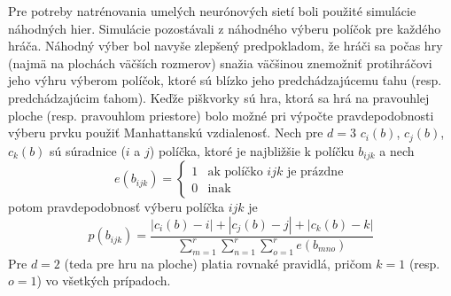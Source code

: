 Pre potreby natrénovania umelých neurónových sietí boli použité simulácie náhodných hier.
Simulácie pozostávali z náhodného výberu políčok pre každého hráča.
Náhodný výber bol navyše zlepšený predpokladom, že hráči sa počas hry (najmä na plochách väčších rozmerov) snažia
väčšinou znemožniť protihráčovi jeho výhru výberom políčok, ktoré sú blízko jeho predchádzajúcemu ťahu
(resp. predchádzajúcim ťahom).
Keďže piškvorky sú hra, ktorá sa hrá na pravouhlej ploche (resp. pravouhlom priestore) bolo možné pri výpočte
pravdepodobnosti výberu prvku použiť Manhattanskú vzdialenosť.
Nech pre $d=3$ $c_i(b)$, $c_j(b)$, $c_k(b)$ sú súradnice ($i$ a $j$) políčka, ktoré je najbližšie k políčku $b_{ijk}$ a
nech
\begin{equation}
    e(b_{ijk}) =
    \begin{cases}
        1 & \text{ak políčko }ijk\text{ je prázdne} \\
        0 & \text{inak}
    \end{cases}
\end{equation}
potom pravdepodobnosť výberu políčka $ijk$ je
\begin{equation}
    p(b_{ijk}) = \frac{|c_i(b) - i| + |c_j(b) - j| + |c_k(b) - k|}{\sum_{m=1}^r\sum_{n=1}^r\sum_{o=1}^r e(b_{mno})}
\end{equation}
Pre $d=2$ (teda pre hru na ploche) platia rovnaké pravidlá, pričom $k=1$ (resp. $o=1$) vo všetkých prípadoch.
